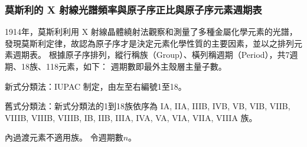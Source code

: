 \documentclass[a4paper,12pt]{report}
\begin{document}
\subsubsection{莫斯利的 X 射線光譜頻率與原子序正比與原子序元素週期表}
1914年，莫斯利利用 X 射線晶體繞射法觀察和測量了多種金屬化學元素的光譜，發現莫斯利定律，故認為原子序才是決定元素化學性質的主要因素，並以之排列元素週期表。 
根據原子序排列，縱行稱族（Group）、橫列稱週期（Period），共7週期、18族、118元素，如下：
\bctf{}\efct
\bctf{}\efct
{}
週期數即最外主殼層主量子數。
\bit
\item 新式分類法：IUPAC 制定，由左至右編號1至18。
\item 舊式分類法：新式分類法的1到18族依序為 IA, IIA, IIIB, IVB, VB, VIB, VIIB, VIIIB, VIIIB, VIIIB, IB, IIB, IIIA, IVA, VA, VIA, VIIA, VIIIA 族。
\item 內過渡元素不適用族。
\eit
{}
令週期數$n$。
\end{document}
